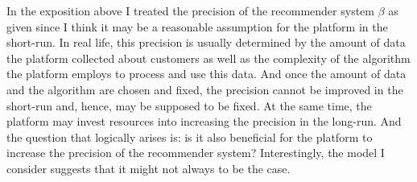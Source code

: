 \documentclass[a4paper]{article}
\begin{document}
In the exposition above I treated the precision of the recommender system $\beta$ as given since I think it may be a reasonable assumption for the platform in the short-run. In real life, this precision is usually determined by the amount of data the platform collected about customers as well as the complexity of the algorithm the platform employs to process and use this data. And once the amount of data and the algorithm are chosen and fixed, the precision cannot be improved in the short-run and, hence, may be supposed to be fixed. At the same time, the platform may invest resources into increasing the precision in the long-run. And the question that logically arises is: is it also beneficial for the platform to increase the precision of the recommender system? Interestingly, the model I consider suggests that it might not always to be the case.
\end{document}
